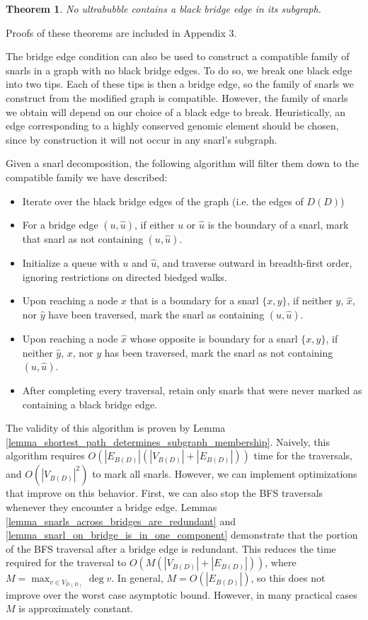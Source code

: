 \documentclass[11pt]{ucthesis}
\newtheorem{theorem}{Theorem}
\begin{document}
\begin{theorem}
	No ultrabubble contains a black bridge edge in its subgraph.
	\label{theorem_ultrabubbles_have_no_bridges}
\end{theorem}

\noindent Proofs of these theorems are included in Appendix 3.	

The bridge edge condition can also be used to construct a compatible family of snarls in a graph with no black bridge edges. To do so, we break one black edge into two tips. Each of these tips is then a bridge edge, so the family of snarls we construct from the modified graph is compatible. However, the family of snarls we obtain will depend on our choice of a black edge to break.  Heuristically, an edge corresponding to a highly conserved genomic element should be chosen, since by construction it will not occur in any snarl's subgraph.

Given a snarl decomposition, the following algorithm will filter them down to the compatible family we have described:

\begin{itemize}
	\item Iterate over the black bridge edges of the graph (i.e. the edges of $D(D)$)
	\item For a bridge edge $(u, \hat u)$, if either $u$ or $\hat u$ is the boundary of a snarl, mark that snarl as not containing $(u, \hat u)$.
	\item Initialize a queue with $u$ and $\hat u$, and traverse outward in breadth-first order, ignoring restrictions on directed biedged walks. 
	\item Upon reaching a node $x$ that is a boundary for a snarl $\{x,y\}$, if neither $y$, $\hat x$, nor $\hat y$ have been traversed, mark the snarl as containing $(u, \hat u)$.
 	\item Upon reaching a node $\hat x$ whose opposite is boundary for a snarl $\{x,y\}$, if neither $\hat y$, $x$, nor $y$ has been traversed, mark the snarl as not containing $(u, \hat u)$.
 	\item After completing every traversal, retain only snarls that were never marked as containing a black bridge edge.
\end{itemize}

The validity of this algorithm is proven by Lemma \ref{lemma_shortest_path_determines_subgraph_membership}. Naively, this algorithm requires $O(|E_{B(D)}|(|V_{B(D)}| + |E_{B(D)}|))$ time for the traversals, and $O(|V_{B(D)}|^2)$ to mark all snarls. However, we can implement optimizations that improve on this behavior. First, we can also stop the BFS traversals whenever they encounter a bridge edge. Lemmas \ref{lemma_snarls_across_bridges_are_redundant} and \ref{lemma_snarl_on_bridge_is_in_one_component} demonstrate that the portion of the BFS traversal after a bridge edge is redundant. This reduces the time required for the traversal to $O(M(|V_{B(D)}| + |E_{B(D)}|))$, where $M = \max_{v \in V_{D(D)}} \deg v$. In general, $M = O(|E_{B(D)}|)$, so this does not improve over the worst case asymptotic bound. However, in many practical cases $M$ is approximately constant. 
\end{document}
